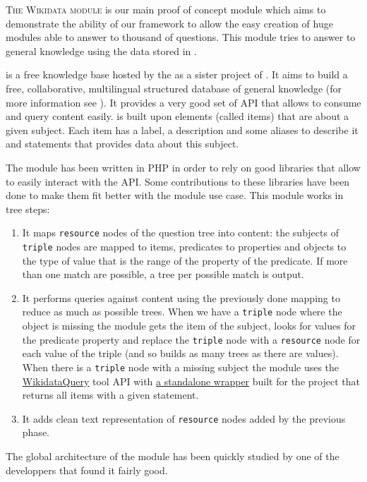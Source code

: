 \lettrine{T}{he Wikidata module} is our main proof of concept module which aims to demonstrate the ability of our framework to allow the easy creation of huge modules able to answer to thousand of questions. This module tries to answer to general knowledge using the data stored in \href{http://www.wikidata.org}{\Wikidata}.

\Wikidata is a free knowledge base hosted by the \Wikimedia as a sister project of \Wikipedia. It aims to build a free, collaborative, multilingual structured database of general knowledge (for more information see \cite{42240}). It provides a very good set of API that allows to consume and query \Wikidata content easily. \Wikidata is built upon elements (called items) that are about a given subject. Each item has a label, a description and some aliases to describe it and statements that provides data about this subject.

The \Wikidata module has been written in PHP in order to rely on good libraries that allow to easily interact with the \Wikidata API. Some contributions to these libraries have been done to make them fit better with the module use case. This module works in tree steps:
\begin{enumerate}
    \item It maps \texttt{resource} nodes of the question tree into \Wikidata content: the subjects of \texttt{triple} nodes are mapped to \Wikidata items, predicates to \Wikidata properties and objects to the type of value that is the range of the \Wikidata property of the predicate. If more than one match are possible, a tree per possible match is output.
    \item It performs queries against \Wikidata content using the previously done mapping to reduce as much as possible trees. When we have a \texttt{triple} node where the object is missing the module gets the \Wikidata item of the subject, looks for values for the predicate property and replace the \texttt{triple} node with a \texttt{resource} node for each value of the triple (and so builds as many trees as there are values). When there is a \texttt{triple} node with a missing subject the module uses the \href{http://wdq.wmflabs.org}{WikidataQuery} tool API with \href{https://github.com/ProjetPP/WikidataQueryApi}{a standalone wrapper} built for the project that returns all items with a given statement.
    \item It adds clean text representation of \texttt{resource} nodes added by the previous phase.
\end{enumerate}

The global architecture of the module has been quickly studied by one of the \Wikidata developpers that found it fairly good.
